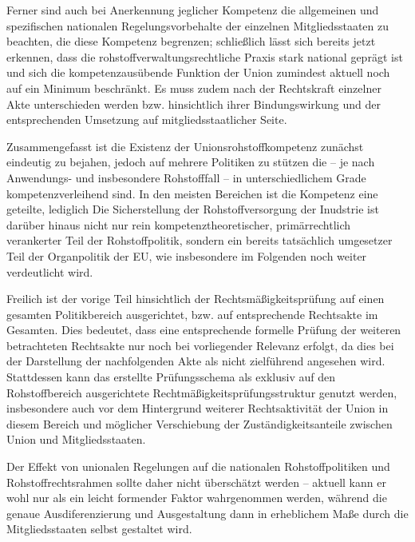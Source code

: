 \documentclass[12pt,a4paper,oneside]{book} %
\begin{document}
	Ferner sind auch bei Anerkennung jeglicher Kompetenz die allgemeinen und spezifischen nationalen Regelungsvorbehalte der einzelnen Mitgliedsstaaten zu beachten, die diese Kompetenz begrenzen; schließlich lässt sich bereits jetzt erkennen, dass die rohstoffverwaltungsrechtliche Praxis stark national geprägt ist und sich die kompetenzausübende Funktion der Union zumindest aktuell noch auf ein Minimum beschränkt. Es muss zudem nach der Rechtskraft einzelner Akte unterschieden werden bzw. hinsichtlich ihrer Bindungswirkung und der entsprechenden Umsetzung auf mitgliedsstaatlicher Seite.
	
	Zusammengefasst ist die Existenz der Unionsrohstoffkompetenz zunächst eindeutig zu bejahen, jedoch auf mehrere Politiken zu stützen die -- je nach Anwendungs- und insbesondere Rohstofffall -- in unterschiedlichem Grade kompetenzverleihend sind. In den meisten Bereichen ist die Kompetenz eine geteilte, lediglich %
	Die Sicherstellung der Rohstoffversorgung der Inudstrie ist darüber hinaus nicht nur rein kompetenztheoretischer, primärrechtlich verankerter Teil der Rohstoffpolitik, sondern ein bereits tatsächlich umgesetzer Teil der Organpolitik der EU, wie insbesondere im Folgenden noch weiter verdeutlicht wird.
	
Freilich ist der vorige Teil hinsichtlich der Rechtsmäßigkeitsprüfung auf einen gesamten Politikbereich ausgerichtet, bzw. auf entsprechende Rechtsakte im Gesamten. Dies bedeutet, dass eine entsprechende formelle Prüfung der weiteren betrachteten Rechtsakte nur noch bei vorliegender Relevanz erfolgt, da dies bei der Darstellung der nachfolgenden Akte als nicht zielführend angesehen wird. Stattdessen kann das erstellte Prüfungsschema als exklusiv auf den Rohstoffbereich ausgerichtete Rechtmäßigkeitsprüfungsstruktur genutzt werden, insbesondere auch vor dem Hintergrund weiterer Rechtsaktivität der Union in diesem Bereich und möglicher Verschiebung der Zuständigkeitsanteile zwischen Union und Mitgliedsstaaten.

Der Effekt von unionalen Regelungen auf die nationalen Rohstoffpolitiken und Rohstoffrechtsrahmen sollte daher nicht überschätzt werden -- aktuell kann er wohl nur als ein leicht formender Faktor wahrgenommen werden, während die genaue Ausdiferenzierung und Ausgestaltung dann in erheblichem Maße durch die Mitgliedsstaaten selbst gestaltet wird.
\end{document}
